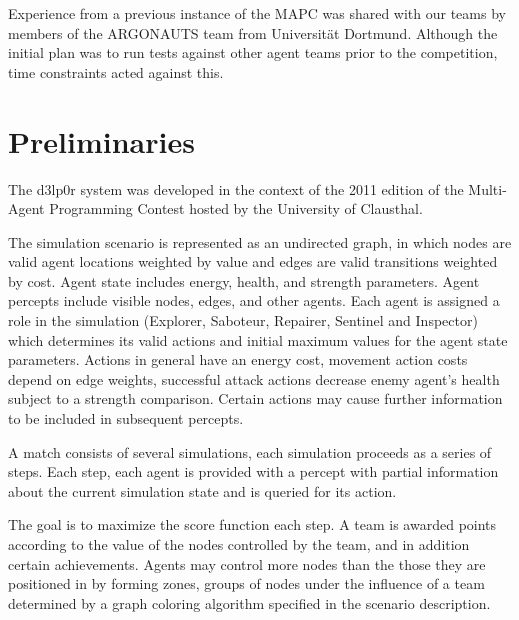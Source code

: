 \documentclass{llncs2e/llncs}
\begin{document}
    Experience from a previous instance of the MAPC was shared with our teams by 
    members of the ARGONAUTS team from Universität Dortmund. Although the initial 
    plan was to run tests against other agent teams prior to the competition, time 
    constraints acted against this.

\begin{comment}
PREGUNTAS {
1. What was the motivation to participate in the contest?
2. What is the history of the team?
3. What is the name of your team?
4. How many developers and designers did you have?  At what level of education 
are your team members?
5. From which field of research do you come form?  Which work is related?
}
\end{comment}

\section{Preliminaries}

    The d3lp0r system was developed in the context of the 2011 edition of the
    Multi-Agent Programming Contest hosted by the University of Clausthal. 

    The simulation scenario is represented as an undirected graph, in which 
    nodes are valid agent locations weighted by value and edges are valid
    transitions weighted by cost. 
    Agent state includes energy, health, and strength parameters. Agent percepts
    include visible nodes, edges, and other agents. 
    Each agent is assigned a role in the simulation (Explorer, Saboteur,
    Repairer, Sentinel and Inspector) which determines its valid actions and
    initial maximum values for the agent state parameters. 
    Actions in general have an energy cost, movement action costs depend on edge
    weights, successful attack actions decrease enemy agent's health subject to
    a strength comparison. Certain actions may cause further information to be
    included in subsequent percepts. 

    A match consists of several simulations, each simulation proceeds as
    a series of steps. Each step, each agent is provided with a percept with
    partial information about the current simulation state and is
    queried for its action. 

    The goal is to maximize the score function each step. A team is awarded
    points according to the value of the nodes controlled by the team, and
    in addition certain achievements. Agents may control more nodes than the
    those they are positioned in by forming zones, groups of nodes under the
    influence of a team determined by a graph coloring algorithm specified in
    the scenario description. 
\end{document}
